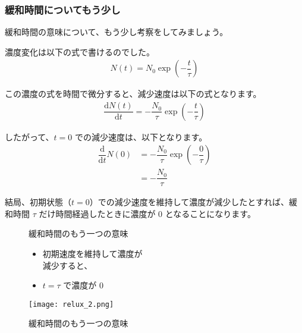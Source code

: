 \documentclass[uplatex,dvipdfmx,a4paper,11pt]{jsarticle}
\begin{document}
\subsubsection{緩和時間についてもう少し}

緩和時間の意味について、もう少し考察をしてみましょう。

濃度変化は以下の式で書けるのでした。
\begin{align*}
	N(t) = N_0 \exp \left(-\dfrac{t}{\tau} \right)
\end{align*}

この濃度の式を時間で微分すると、減少速度は以下の式となります。
\begin{align*}
	\dfrac{\mathrm{d}N(t)}{\mathrm{d}t} = -\dfrac{N_0}{\tau} \exp \left(-\dfrac{t}{\tau} \right)
\end{align*}

したがって、$t=0$ での減少速度は、以下となります。
\begin{align*}
	\dfrac{\mathrm{d}}{\mathrm{d}t}N(0) &=-\dfrac{N_0}{\tau} \exp \left(-\dfrac{0}{\tau} \right) \\
	&=-\dfrac{N_0}{\tau}
\end{align*}

結局、初期状態（$t=0$）での減少速度を維持して濃度が減少したとすれば、緩和時間 $\tau$ だけ時間経過したときに濃度が 0 となることになります。
\begin{figure}[htb]
	\begin{center}
		\begin{minipage}{0.45\textwidth}
			\large
			\begin{itembox}[l]{緩和時間のもう一つの意味}
				\begin{itemize}
					\item 初期速度を維持して濃度が\\減少すると、
					\item $t=\tau$ で濃度が 0
				\end{itemize}
			\end{itembox}
		\end{minipage}
		\begin{minipage}{0.45\textwidth}
			\begin{center}
			\texttt{[image: relux\_2.png]}
			\end{center}
		\end{minipage}
		\caption{緩和時間のもう一つの意味}
		\label{fig:exp_kanwa2}
	\end{center}
\end{figure}
\end{document}
